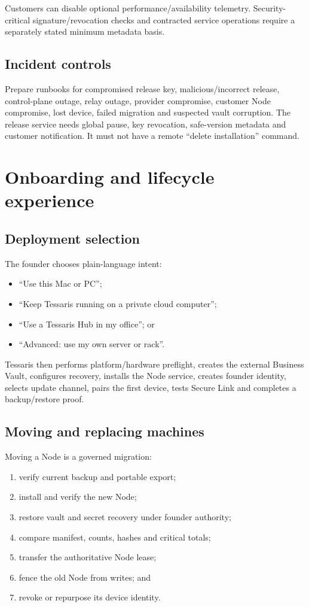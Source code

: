 \documentclass[11pt]{article}
\begin{document}
Customers can disable optional performance/availability telemetry. Security-critical signature/revocation checks and contracted service operations require a separately stated minimum metadata basis.

\subsection{Incident controls}

Prepare runbooks for compromised release key, malicious/incorrect release, control-plane outage, relay outage, provider compromise, customer Node compromise, lost device, failed migration and suspected vault corruption. The release service needs global pause, key revocation, safe-version metadata and customer notification. It must not have a remote ``delete installation'' command.

\section{Onboarding and lifecycle experience}

\subsection{Deployment selection}

The founder chooses plain-language intent:

\begin{itemize}
  \item ``Use this Mac or PC'';
  \item ``Keep Tessaris running on a private cloud computer'';
  \item ``Use a Tessaris Hub in my office''; or
  \item ``Advanced: use my own server or rack''.
\end{itemize}

Tessaris then performs platform/hardware preflight, creates the external Business Vault, configures recovery, installs the Node service, creates founder identity, selects update channel, pairs the first device, tests Secure Link and completes a backup/restore proof.

\subsection{Moving and replacing machines}

Moving a Node is a governed migration:

\begin{enumerate}
  \item verify current backup and portable export;
  \item install and verify the new Node;
  \item restore vault and secret recovery under founder authority;
  \item compare manifest, counts, hashes and critical totals;
  \item transfer the authoritative Node lease;
  \item fence the old Node from writes; and
  \item revoke or repurpose its device identity.
\end{enumerate}
\end{document}
